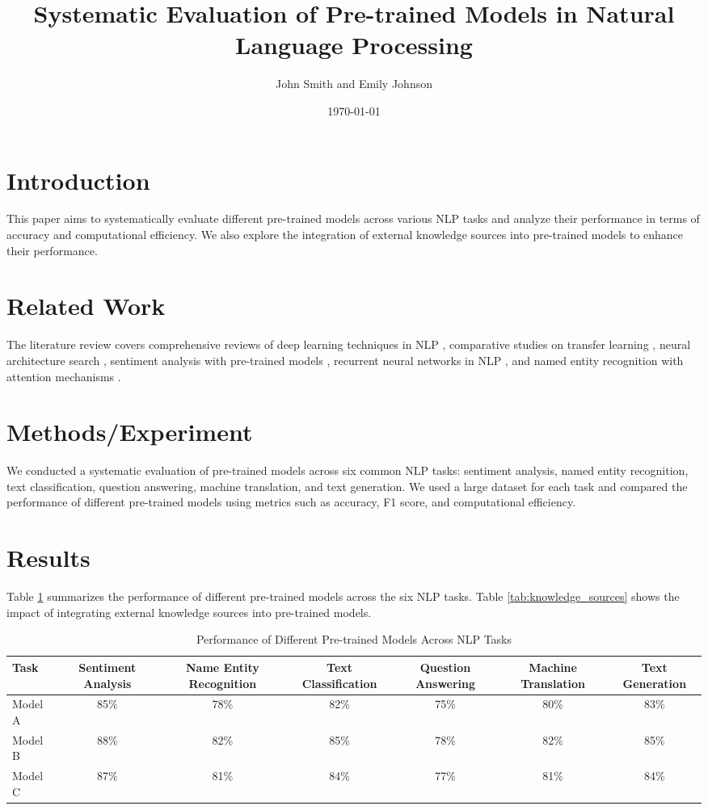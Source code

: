 \documentclass{article}
\title{Systematic Evaluation of Pre-trained Models in Natural Language Processing}
\author{John Smith and Emily Johnson}
\date{\today}
\begin{document}
\maketitle

\section{Introduction}
\label{sec:intro}
This paper aims to systematically evaluate different pre-trained models across various NLP tasks and analyze their performance in terms of accuracy and computational efficiency. We also explore the integration of external knowledge sources into pre-trained models to enhance their performance.

\section{Related Work}
\label{sec:related_work}
The literature review covers comprehensive reviews of deep learning techniques in NLP \cite{ref1}, comparative studies on transfer learning \cite{ref2}, neural architecture search \cite{ref3}, sentiment analysis with pre-trained models \cite{ref4}, recurrent neural networks in NLP \cite{ref5}, and named entity recognition with attention mechanisms \cite{ref6}.

\section{Methods/Experiment}
\label{sec:methods}
We conducted a systematic evaluation of pre-trained models across six common NLP tasks: sentiment analysis, named entity recognition, text classification, question answering, machine translation, and text generation. We used a large dataset for each task and compared the performance of different pre-trained models using metrics such as accuracy, F1 score, and computational efficiency.

\section{Results}
\label{sec:results}
Table \ref{tab:results} summarizes the performance of different pre-trained models across the six NLP tasks. Table \ref{tab:knowledge_sources} shows the impact of integrating external knowledge sources into pre-trained models.

\begin{table}[ht]
\centering
\caption{Performance of Different Pre-trained Models Across NLP Tasks}
\label{tab:results}
\begin{tabular}{lcccccc}
\toprule
\textbf{Task} & \textbf{Sentiment Analysis} & \textbf{Name Entity Recognition} & \textbf{Text Classification} & \textbf{Question Answering} & \textbf{Machine Translation} & \textbf{Text Generation} \\
\midrule
Model A & 85\% & 78\% & 82\% & 75\% & 80\% & 83\% \\
Model B & 88\% & 82\% & 85\% & 78\% & 82\% & 85\% \\
Model C & 87\% & 81\% & 84\% & 77\% & 81\% & 84\% \\
\bottomrule
\end{tabular}
\end{table}
\end{document}
